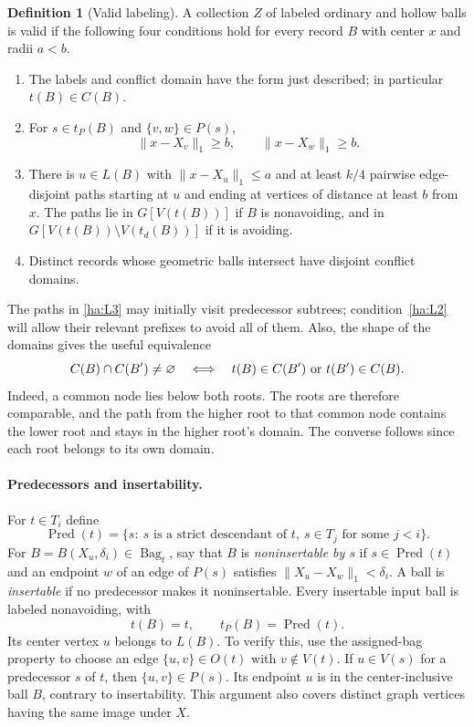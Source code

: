 \documentclass[11pt]{amsart}
\theoremstyle{definition}
\newtheorem{definition}[theorem]{Definition}
\theoremstyle{remark}
\numberwithin{equation}{section}
\begin{document}
\begin{definition}[Valid labeling]\label{ha:valid-labeling}
A collection $Z$ of labeled ordinary and hollow balls is valid if the
following four conditions hold for every record $B$ with center $x$
and radii $a<b$.
\begin{enumerate}
 \renewcommand{\theenumi}{L\arabic{enumi}}
 \renewcommand{\labelenumi}{(\theenumi)}
 \item\label{ha:L1} The labels and conflict domain have the form just
 described; in particular $t(B)\in C(B)$.
 \item\label{ha:L2} For $s\in t_P(B)$ and $\{v,w\}\in P(s)$,
 \[
       \|x-X_v\|_1\ge b,\qquad \|x-X_w\|_1\ge b.
 \]
 \item\label{ha:L3} There is $u\in L(B)$ with $\|x-X_u\|_1\le a$
 and at least $k/4$ pairwise edge-disjoint paths starting at $u$ and
 ending at vertices of distance at least $b$ from $x$.  The paths lie
 in $G[V(t(B))]$ if $B$ is nonavoiding, and in
 $G[V(t(B))\setminus V(t_d(B))]$ if it is avoiding.
 \item\label{ha:L4} Distinct records whose geometric balls intersect
 have disjoint conflict domains.
\end{enumerate}
\end{definition}

The paths in \ref{ha:L3} may initially visit predecessor subtrees;
condition~\ref{ha:L2} will allow their relevant prefixes to avoid all
of them.  Also, the shape of the domains gives the useful equivalence
\begin{equation}\label{ha:domain-root-test}
 C(B)\cap C(B')\ne\varnothing
 \quad\Longleftrightarrow\quad
 t(B)\in C(B')\ \hbox{or}\ t(B')\in C(B).
\end{equation}
Indeed, a common node lies below both roots.  The roots are therefore
comparable, and the path from the higher root to that common node
contains the lower root and stays in the higher root's domain.
The converse follows since each root belongs to its own domain.

\paragraph{Predecessors and insertability.}
For $t\in T_i$ define
\[
 \operatorname{Pred}(t)=
 \{s:\ s\text{ is a strict descendant of }t,
                  \ s\in T_j\text{ for some }j<i\}.
\]
For $B=B(X_u,\delta_i)\in\operatorname{Bag}_t$, say that $B$ is
\emph{noninsertable by $s$} if $s\in\operatorname{Pred}(t)$ and an
endpoint $w$ of an edge of $P(s)$ satisfies
$\|X_u-X_w\|_1<\delta_i$.  A ball is \emph{insertable} if no
predecessor makes it noninsertable.  Every insertable input ball is
labeled nonavoiding, with
\[
       t(B)=t,\qquad t_P(B)=\operatorname{Pred}(t).
\]
Its center vertex $u$ belongs to $L(B)$.  To verify this, use the
assigned-bag property to choose an edge $\{u,v\}\in O(t)$ with
$v\notin V(t)$.  If $u\in V(s)$ for a predecessor $s$ of $t$, then
$\{u,v\}\in P(s)$.  Its endpoint $u$ is in the center-inclusive
ball $B$, contrary to insertability.  This argument also covers
distinct graph vertices having the same image under $X$.
\end{document}
